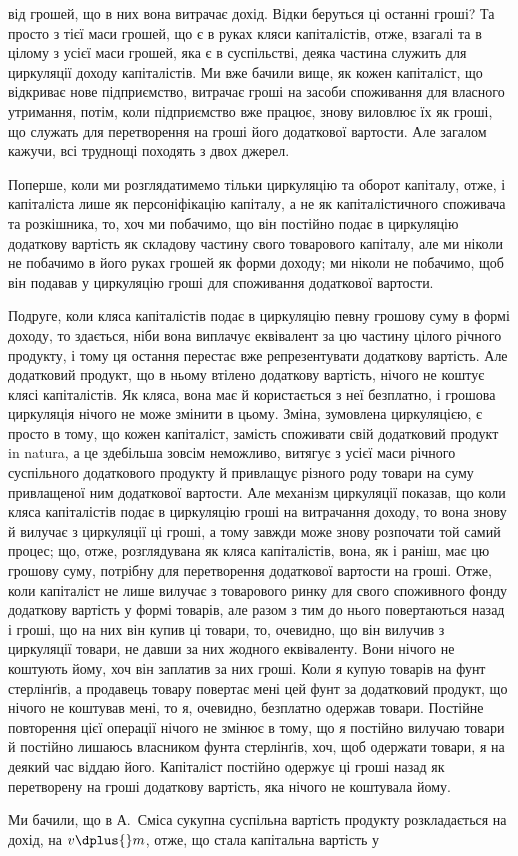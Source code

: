 \parcont{}  %
від грошей, що в них вона витрачає дохід. Відки беруться ці останні
гроші? Та просто з тієї маси грошей, що є в руках кляси капіталістів,
отже, взагалі та в цілому з усієї маси грошей, яка є в суспільстві,
деяка частина служить для циркуляції доходу капіталістів. Ми
вже бачили вище, як кожен капіталіст, що відкриває нове підприємство,
витрачає гроші на засоби споживання для власного утримання, потім,
коли підприємство вже працює, знову виловлює їх як гроші, що служать
для перетворення на гроші його додаткової вартости. Але загалом кажучи,
всі труднощі походять з двох джерел.

Поперше, коли ми розглядатимемо тільки циркуляцію та оборот капіталу,
отже, і капіталіста лише як персоніфікацію капіталу, а не як капіталістичного
споживача та розкішника, то, хоч ми побачимо, що він
постійно подає в циркуляцію додаткову вартість як складову частину
свого товарового капіталу, але ми ніколи не побачимо в його руках грошей
як форми доходу; ми ніколи не побачимо, щоб він подавав у циркуляцію
гроші для споживання додаткової вартости.

Подруге, коли кляса капіталістів подає в циркуляцію певну грошову
суму в формі доходу, то здається, ніби вона виплачує еквівалент за цю
частину цілого річного продукту, і тому ця остання перестає вже репрезентувати
додаткову вартість. Але додатковий продукт, що в ньому
втілено додаткову вартість, нічого не коштує клясі капіталістів. Як кляса,
вона має й користається з неї безплатно, і грошова циркуляція нічого
не може змінити в цьому. Зміна, зумовлена циркуляцією, є просто в тому,
що кожен капіталіст, замість споживати свій додатковий продукт in natura,
а це здебільша зовсім неможливо, витягує з усієї маси річного суспільного
додаткового продукту й привлащує різного роду товари на суму
привлащеної ним додаткової вартости. Але механізм циркуляції показав,
що коли кляса капіталістів подає в циркуляцію гроші на витрачання
доходу, то вона знову й вилучає з циркуляції ці гроші, а тому завжди
може знову розпочати той самий процес; що, отже, розглядувана як
кляса капіталістів, вона, як і раніш, має цю грошову суму, потрібну для
перетворення додаткової вартости на гроші. Отже, коли капіталіст не
лише вилучає з товарового ринку для свого споживного фонду додаткову
вартість у формі товарів, але разом з тим до нього повертаються назад
і гроші, що на них він купив ці товари, то, очевидно, що він вилучив
з циркуляції товари, не давши за них жодного еквіваленту. Вони нічого
не коштують йому, хоч він заплатив за них гроші. Коли я купую товарів
на фунт стерлінґів, а продавець товару повертає мені цей фунт за додатковий
продукт, що нічого не коштував мені, то я, очевидно, безплатно
одержав товари. Постійне повторення цієї операції нічого не змінює в
тому, що я постійно вилучаю товари й постійно лишаюсь власником
фунта стерлінґів, хоч, щоб одержати товари, я на деякий час віддаю
його. Капіталіст постійно одержує ці гроші назад як перетворену на
гроші додаткову вартість, яка нічого не коштувала йому.

Ми бачили, що в А.~Сміса сукупна суспільна вартість продукту розкладається
на дохід, на $v \dplus{} m$, отже, що стала капітальна вартість у
\parbreak{}  %
